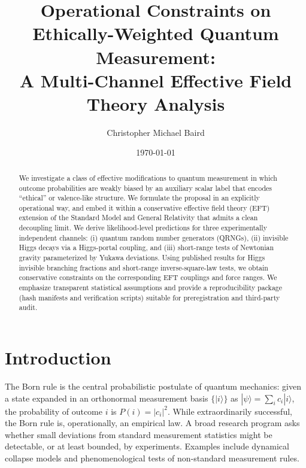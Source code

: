 \documentclass[11pt]{article}
\title{Operational Constraints on Ethically-Weighted Quantum Measurement:\\
A Multi-Channel Effective Field Theory Analysis}
\author{Christopher Michael Baird}
\date{\today}
\begin{document}
\maketitle
\begin{center}
\end{center}

\begin{abstract}
We investigate a class of effective modifications to quantum measurement in which outcome probabilities are weakly biased by an auxiliary scalar label that encodes ``ethical'' or valence-like structure. We formulate the proposal in an explicitly operational way, and embed it within a conservative effective field theory (EFT) extension of the Standard Model and General Relativity that admits a clean decoupling limit. We derive likelihood-level predictions for three experimentally independent channels: (i) quantum random number generators (QRNGs), (ii) invisible Higgs decays via a Higgs-portal coupling, and (iii) short-range tests of Newtonian gravity parameterized by Yukawa deviations. Using published results for Higgs invisible branching fractions and short-range inverse-square-law tests, we obtain conservative constraints on the corresponding EFT couplings and force ranges. We emphasize transparent statistical assumptions and provide a reproducibility package (hash manifests and verification scripts) suitable for preregistration and third-party audit.
\end{abstract}

\section{Introduction}
The Born rule is the central probabilistic postulate of quantum mechanics: given a state expanded in an orthonormal measurement basis $\{ |i\rangle \}$ as $|\psi\rangle=\sum_i c_i |i\rangle$, the probability of outcome $i$ is $P(i)=|c_i|^2$. While extraordinarily successful, the Born rule is, operationally, an empirical law. A broad research program asks whether small deviations from standard measurement statistics might be detectable, or at least bounded, by experiments. Examples include dynamical collapse models and phenomenological tests of non-standard measurement rules.
\end{document}
